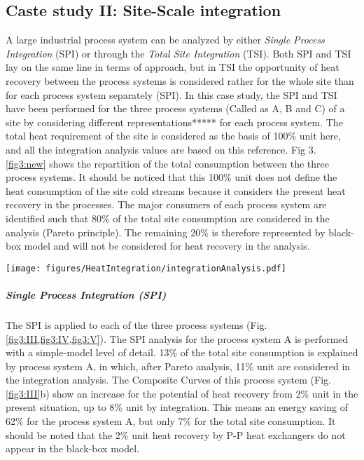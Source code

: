\subsection{Caste study II: Site-Scale integration}

A large industrial process system can be analyzed by either \textit{Single Process Integration} (SPI) or through the \textit{Total Site Integration} (TSI). Both SPI and TSI lay on the same line in terms of approach, but in TSI the opportunity of heat recovery between the process systems is considered rather for the whole site than for each process system separately (SPI). In this case study, the SPI and TSI have been performed for the three process systems (Called as A, B and C) of a site by considering different representations***** for each process system. The total heat requirement of the site is considered as the basis of 100\% unit here, and all the integration analysis values are based on this reference. Fig 3. \ref{fig3:new} shows the repartition of the total consumption between the three process systems. It should be noticed that this 100\% unit does not define the heat consumption of the site cold streams because it considers the present heat recovery in the processes. The major consumers of each process system are identified such that 80\% of the total site consumption are considered in the analysis (Pareto principle). The remaining 20\% is therefore represented by black-box model and will not be considered for heat recovery in the analysis. 

\begin{figure*}[!ht]
\vspace{5mm}
\begin{center}
\texttt{[image: figures/HeatIntegration/integrationAnalysis.pdf]}
\caption{Summary of SPI and TSI for the three process subsystems of the site}
\label{fig3:new}
\end{center}
\end{figure*}

\subparagraph{Single Process Integration (SPI)}

The SPI is applied to each of the three process systems (Fig. \ref{fig3:III,fig3:IV,fig3:V}). The SPI analysis for the process system A is performed with a simple-model level of detail. 13\% of the total site consumption is explained by process system A, in which, after Pareto analysis, 11\% unit are considered in the integration analysis. The Composite Curves of this process system (Fig. \ref{fig3:III}b) show an increase for the potential of heat recovery from 2\% unit in the present situation, up to 8\% unit by integration. This means an energy saving of 62\% for the process system A, but only 7\% for the total site consumption. It should be noted that the 2\% unit heat recovery by P-P heat exchangers do not appear in the black-box model.

